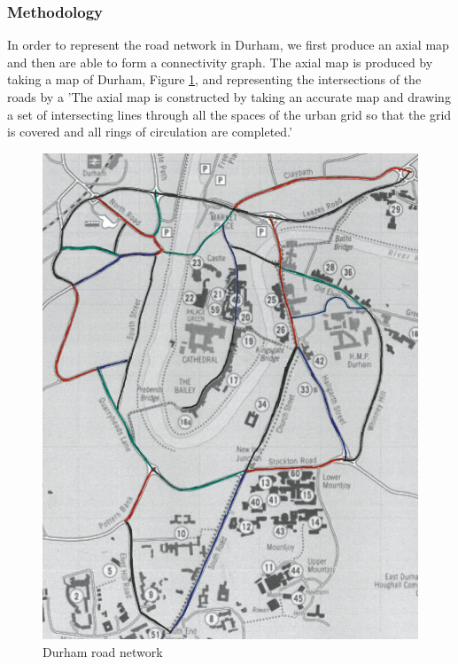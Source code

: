 \documentclass[11pt]{report}
\begin{document}
\subsubsection{Methodology}
In order to represent the road network in Durham, we first produce an axial map and then are able to form a connectivity graph. The axial map is produced by taking a map of Durham, Figure \ref{durham map}, and representing the intersections of the roads by a 'The axial map is constructed by taking an accurate map and drawing a set of intersecting lines through all the spaces of the urban grid so that the grid is covered and all rings of circulation are completed.' \cite{Axialmap40:online}

\begin{figure}[h]
\centering
\includegraphics[width=\linewidth]{durham_with_colour.jpg}
\caption{Durham road network}
\label{durham map}
\end{figure}
\end{document}

